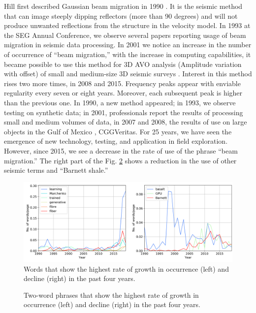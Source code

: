 \documentclass[geosciences,article,submit,moreauthors,pdftex]{Definitions/mdpi}
\begin{document}
Hill first described Gaussian beam migration in 1990 \citep{Hill1990}. It is the seismic method that can image steeply dipping reflectors (more than 90 degrees) and will not produce unwanted reflections from the structure in the velocity model. In 1993 at the SEG Annual Conference, we observe several papers reporting usage of beam migration in seismic data processing. In 2001 we notice an increase in the number of occurrence of ``beam migration,'' with the increase in computing capabilities, it became possible to use this method for 3D AVO analysis (Amplitude variation with offset) of small and medium-size 3D seismic surveys \citep{Huang2001}. Interest in this method rises two more times, in 2008 and 2015. Frequency peaks appear with enviable regularity every seven or eight years. Moreover, each subsequent peak is higher than the previous one. In 1990, a new method appeared; in 1993, we observe testing on synthetic data; in 2001, professionals report the results of processing small and medium volumes of data, in 2007 and 2008, the results of use on large objects in the Gulf of Mexico \citep{Ting2008}, CGGVeritas. For 25 years, we have seen the emergence of new technology, testing, and application in field exploration. However, since 2015, we see a decrease in the rate of use of the phrase ``beam migration.'' The right part of the Fig. \ref{bigrams} shows a reduction in the use of other seismic terms and ``Barnett shale.''


\begin{figure}[ht!]

\includegraphics[width=\textwidth]{si_grow_decl.png}
\caption{Words that show the highest rate of growth in occurrence (left) and decline (right) in the past four years.}
\label{sigrams}
\end{figure}

\begin{figure}[ht!]
\caption{Two-word phrases that show the highest rate of growth in occurrence (left) and decline (right) in the past four years.}
\label{bigrams}
\end{figure}
\end{document}
